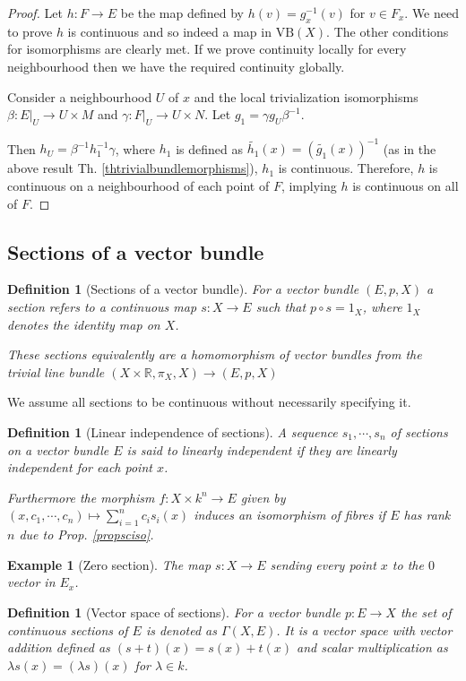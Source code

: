 \documentclass[12pt]{article}
\numberwithin{equation}{section}
\newcommand{\R}{\mathbb{R}}
\newcounter{dummy} \numberwithin{dummy}{section}
\newtheorem{definition}[dummy]{Definition}
\newtheorem{example}[dummy]{Example}
\begin{document}
	\begin{proof}
		Let $h: F\to E$ be the map defined by $h(v) = g_x^{-1}(v)$ for $v \in F_x$. We need to prove $h$ is continuous and so indeed a map in $\mathrm{VB}(X)$. The other conditions for isomorphisms are clearly met. If we prove continuity locally for every neighbourhood then we have the required continuity globally.
		
		 Consider a neighbourhood $U$ of $x$ and the local trivialization isomorphisms $\beta: E|_U \to U \times M$ and $\gamma: F|_U \to U \times N$. Let $g_1 = \gamma g_U \beta^{-1}$. 
		 
		 Then $h_U = \beta^{-1} h_1^{-1} \gamma$, where $h_1$ is defined as $\widetilde{h_1}(x) = (\widetilde{g_1}(x))^{-1}$ (as in the above result Th. \ref{thtrivialbundlemorphisms}), $h_1$ is continuous.  Therefore, $h$ is continuous on a neighbourhood of each point of $F$, implying $h$ is continuous on all of $F$.
	\end{proof}
	
	\subsection{Sections of a vector bundle}
	
	\begin{definition}[Sections of a vector bundle]
		For a vector bundle $(E,p,X)$ a section refers to a continuous map	$s: X \to E$ such that $p \circ s= 1_X$, where $1_X$ denotes the identity map on $X$.
		
		These sections equivalently are a homomorphism of vector bundles from the trivial line bundle $(X \times \R, \pi_X, X) \to (E,p,X)$
	\end{definition}
	We assume all sections to be continuous without necessarily specifying it.
	
	\begin{definition}[Linear independence of sections]\label{deflinindsections}
		A sequence $s_1, \cdots, s_n$ of sections on a vector bundle $E$ is said to linearly independent if they are linearly independent for each point $x$.
		
		Furthermore the morphism $f: X \times k^n \to E$ given by $(x,c_1, \cdots, c_n) \mapsto \sum_{i=1}^n c_i s_i(x)$ induces an isomorphism of fibres if $E$ has rank $n$ due to Prop. \ref{propsciso}.
		
	\end{definition}
	
	\begin{example}[Zero section]
		The map $s:X \to E $ sending every point $x$ to the $0$ vector in $E_x$.	
	\end{example}
	\begin{definition}[Vector space of sections]
		For a vector bundle $p:E \to X $ the set of continuous sections of $E$ is denoted as $\Gamma (X ,E)$. It is a vector space with vector addition defined as $(s+t)(x)=s(x)+t(x)$ and scalar multiplication as $\lambda s (x) = (\lambda s)(x)$ for $\lambda \in k$.	
	\end{definition}
	
\end{document}
